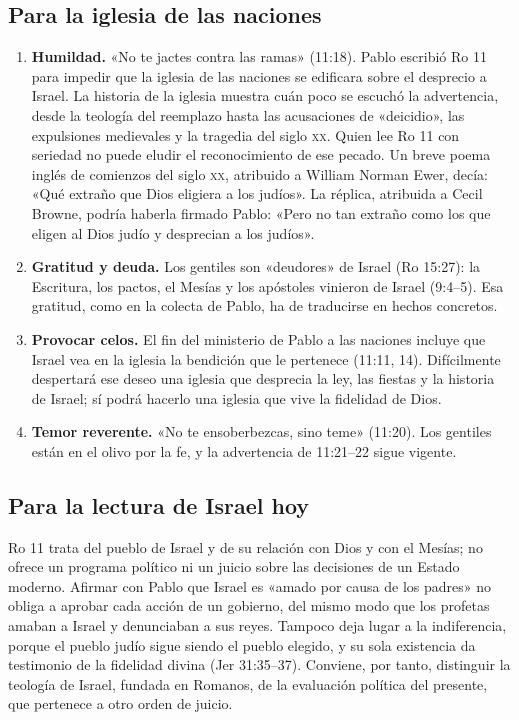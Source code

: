 \documentclass[11pt,letterpaper]{article}
\begin{document}
\subsection{Para la iglesia de las naciones}
\begin{enumerate}
\item \textbf{Humildad.} «No te jactes contra las ramas» (11:18). Pablo escribió Ro 11 para impedir que la iglesia de las naciones se edificara sobre el desprecio a Israel. La historia de la iglesia muestra cuán poco se escuchó la advertencia, desde la teología del reemplazo hasta las acusaciones de «deicidio», las expulsiones medievales y la tragedia del siglo \textsc{xx}. Quien lee Ro 11 con seriedad no puede eludir el reconocimiento de ese pecado. Un breve poema inglés de comienzos del siglo \textsc{xx}, atribuido a William Norman Ewer, decía: «Qué extraño que Dios eligiera a los judíos». La réplica, atribuida a Cecil Browne, podría haberla firmado Pablo: «Pero no tan extraño como los que eligen al Dios judío y desprecian a los judíos».
\item \textbf{Gratitud y deuda.} Los gentiles son «deudores» de Israel (Ro 15:27): la Escritura, los pactos, el Mesías y los apóstoles vinieron de Israel (9:4--5). Esa gratitud, como en la colecta de Pablo, ha de traducirse en hechos concretos.
\item \textbf{Provocar celos.} El fin del ministerio de Pablo a las naciones incluye que Israel vea en la iglesia la bendición que le pertenece (11:11, 14). Difícilmente despertará ese deseo una iglesia que desprecia la ley, las fiestas y la historia de Israel; sí podrá hacerlo una iglesia que vive la fidelidad de Dios.
\item \textbf{Temor reverente.} «No te ensoberbezcas, sino teme» (11:20). Los gentiles están en el olivo por la fe, y la advertencia de 11:21--22 sigue vigente.
\end{enumerate}

\subsection{Para la lectura de Israel hoy}
Ro 11 trata del pueblo de Israel y de su relación con Dios y con el Mesías; no ofrece un programa político ni un juicio sobre las decisiones de un Estado moderno. Afirmar con Pablo que Israel es «amado por causa de los padres» no obliga a aprobar cada acción de un gobierno, del mismo modo que los profetas amaban a Israel y denunciaban a sus reyes. Tampoco deja lugar a la indiferencia, porque el pueblo judío sigue siendo el pueblo elegido, y su sola existencia da testimonio de la fidelidad divina (Jer 31:35--37). Conviene, por tanto, distinguir la teología de Israel, fundada en Romanos, de la evaluación política del presente, que pertenece a otro orden de juicio.
\end{document}
